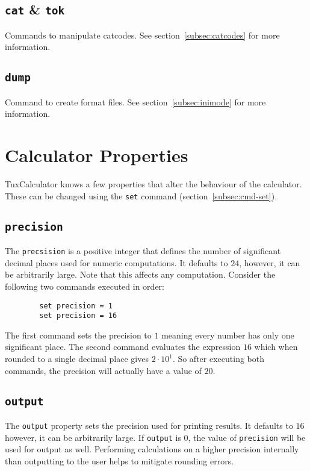 \documentclass[10pt]{article}
\begin{document}
    \subsection{\texttt{cat} \& \texttt{tok}}\label{subsec:cmd-cat-tok}
    Commands to manipulate catcodes.
    See section~\ref{subsec:catcodes} for more information.
    
    \subsection{\texttt{dump}}\label{subsec:cmd-dump}
    Command to create format files.
    See section~\ref{subsec:inimode} for more information.

    \section{Calculator Properties}\label{sec:calculator-properties}
    TuxCalculator knows a few properties that alter the behaviour of the calculator.
    These can be changed using the \verb|set| command (section~\ref{subsec:cmd-set}).
    
    \subsection{\texttt{precision}}\label{subsec:precision}
    The \verb|precsision| is a positive integer that defines the number of significant decimal places used for numeric computations.
    It defaults to $ 24 $, however, it can be arbitrarily large.
    Note that this affects any computation.
    Consider the following two commands executed in order:
    \begin{verbatim}
        set precision = 1
        set precision = 16
    \end{verbatim}
    The first command sets the precision to $ 1 $ meaning every number has only one significant place.
    The second command evaluates the expression $ 16 $ which when rounded to a single decimal place gives $ 2 \cdot 10^1 $.
    So after executing both commands, the precision will actually have a value of $ 20 $.
    
    \subsection{\texttt{output}}\label{subsec:output}
    The \verb|output| property sets the precision used for printing results.
    It defaults to $ 16 $ however, it can be arbitrarily large.
    If \verb|output| is $ 0 $, the value of \verb|precision| will be used for output as well.
    Performing calculations on a higher precision internally than outputting to the user helps to mitigate rounding errors.
    
\end{document}
